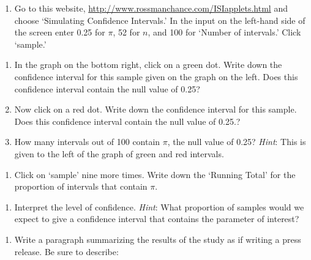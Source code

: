 \documentclass[
]{report}
\providecommand{\tightlist}{%
  \setlength{\itemsep}{0pt}\setlength{\parskip}{0pt}}
\begin{document}
\begin{enumerate}
\def\labelenumi{\arabic{enumi}.}
\setcounter{enumi}{13}
\tightlist
\item
  Go to this website, \url{http://www.rossmanchance.com/ISIapplets.html} and choose `Simulating Confidence Intervals.' In the input on the left-hand side of the screen enter 0.25 for \(\pi\), 52 for \(n\), and 100 for `Number of intervals.' Click `sample.'
  \vspace{1mm}
\end{enumerate}

\begin{enumerate}
\def\labelenumi{\alph{enumi})}
\item
  In the graph on the bottom right, click on a green dot. Write down the confidence interval for this sample given on the graph on the left. Does this confidence interval contain the null value of 0.25?
  \vspace{0.5in}
\item
  Now click on a red dot. Write down the confidence interval for this sample. Does this confidence interval contain the null value of 0.25.?
  \vspace{0.5in}
\item
  How many intervals out of 100 contain \(\pi\), the null value of 0.25? \emph{Hint}: This is given to the left of the graph of green and red intervals.
  \vspace{0.5in}
\end{enumerate}

\begin{enumerate}
\def\labelenumi{\arabic{enumi}.}
\setcounter{enumi}{14}
\tightlist
\item
  Click on `sample' nine more times. Write down the `Running Total' for the proportion of intervals that contain \(\pi\).
\end{enumerate}

\vspace{0.5in}

\begin{enumerate}
\def\labelenumi{\arabic{enumi}.}
\setcounter{enumi}{15}
\tightlist
\item
  Interpret the level of confidence. \emph{Hint}: What proportion of samples would we expect to give a confidence interval that contains the parameter of interest?
\end{enumerate}

\vspace{0.8in}

\begin{enumerate}
\def\labelenumi{\arabic{enumi}.}
\setcounter{enumi}{16}
\tightlist
\item
  Write a paragraph summarizing the results of the study as if writing a press release. Be sure to describe:
\end{enumerate}
\end{document}
